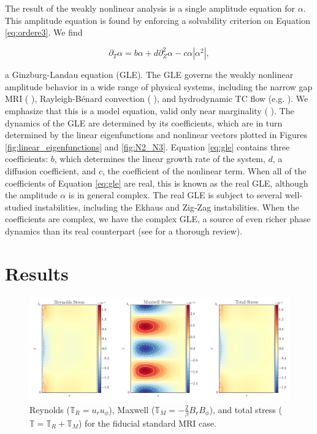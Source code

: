 \documentclass{emulateapj}
\newcommand{\beq}{\begin{equation}}
\newcommand{\eeq}{\end{equation}}
\newcommand{\citei}[1]{\citeauthor{#1} \citeyear{#1}}
\begin{document}

The result of the weakly nonlinear analysis is a single amplitude equation for $\alpha$. This amplitude equation is found by enforcing a solvability criterion on Equation \ref{eq:ordere3}. We find

\beq
 \label{eq:gle}
\partial_T \alpha = b \alpha + d \partial_Z^2 \alpha - c \alpha \left|\alpha^2\right|,
\eeq

a Ginzburg-Landau equation (GLE). The GLE governs the weakly nonlinear amplitude behavior in a wide range of physical systems, including the narrow gap MRI (\citei{Umurhan:2007hs}), Rayleigh-B\'enard convection (\citei{Newell:1969wr}), and hydrodynamic TC flow (e.g. \citei{Recktenwald:1993}). We emphasize that this is a model equation, valid only near marginality (\citei{Cross:1993el}). The dynamics of the GLE are determined by its coefficients, which are in turn determined by the linear eigenfunctions and nonlinear vectors plotted in Figures \ref{fig:linear_eigenfunctions} and \ref{fig:N2_N3}. Equation \ref{eq:gle} contains three coefficients: $b$, which determines the linear growth rate of the system, $d$, a diffusion coefficient, and $c$, the coefficient of the nonlinear term. When all of the coefficients of Equation \ref{eq:gle} are real, this is known as the real GLE, although the amplitude $\alpha$ is in general complex. The real GLE is subject to several well-studied instabilities, including the Ekhaus and Zig-Zag instabilities. When the coefficients are complex, we have the complex GLE, a source of even richer phase dynamics than its real counterpart (see \citei{Aranson:2002} for a thorough review).


\section{Results}
\label{sec:results}
\begin{figure}
\centering
\includegraphics[width=\textwidth]{../figures/fiducial_standard_mri_stressplot_Pm_16E-7.png}
\caption{Reynolds ($\mathbb{T}_{R} = u_r u_\phi$), Maxwell ($\mathbb{T}_{M} = -\frac{2}{\beta} B_r B_\phi$), and total stress ($\mathbb{T} = \mathbb{T}_{R} + \mathbb{T}_{M}$) for the fiducial standard MRI case. }
\end{figure}
\end{document}
